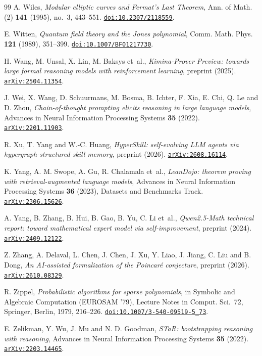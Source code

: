 \begin{thebibliography}{99}
A. Wiles,
\emph{Modular elliptic curves and Fermat's Last Theorem},
Ann. of Math. (2) \textbf{141} (1995), no.~3, 443--551.
\href{https://doi.org/10.2307/2118559}{\nolinkurl{doi:10.2307/2118559}}.

E. Witten,
\emph{Quantum field theory and the Jones polynomial},
Comm. Math. Phys. \textbf{121} (1989), 351--399.
\href{https://doi.org/10.1007/BF01217730}{\nolinkurl{doi:10.1007/BF01217730}}.

H. Wang, M. Unsal, X. Lin, M. Baksys et~al.,
\emph{Kimina-Prover Preview: towards large formal reasoning models with reinforcement learning},
preprint (2025).
\href{https://arxiv.org/abs/2504.11354}{\nolinkurl{arXiv:2504.11354}}.

J. Wei, X. Wang, D. Schuurmans, M. Bosma, B. Ichter, F. Xia, E. Chi, Q. Le and D. Zhou,
\emph{Chain-of-thought prompting elicits reasoning in large language models},
Advances in Neural Information Processing Systems \textbf{35} (2022).
\href{https://arxiv.org/abs/2201.11903}{\nolinkurl{arXiv:2201.11903}}.

R. Xu, T. Yang and W.-C. Huang,
\emph{HyperSkill: self-evolving LLM agents via hypergraph-structured skill memory},
preprint (2026).
\href{https://arxiv.org/abs/2608.16114}{\nolinkurl{arXiv:2608.16114}}.

K. Yang, A. M. Swope, A. Gu, R. Chalamala et~al.,
\emph{LeanDojo: theorem proving with retrieval-augmented language models},
Advances in Neural Information Processing Systems \textbf{36} (2023), Datasets and Benchmarks Track.
\href{https://arxiv.org/abs/2306.15626}{\nolinkurl{arXiv:2306.15626}}.

A. Yang, B. Zhang, B. Hui, B. Gao, B. Yu, C. Li et~al.,
\emph{Qwen2.5-Math technical report: toward mathematical expert model via self-improvement},
preprint (2024).
\href{https://arxiv.org/abs/2409.12122}{\nolinkurl{arXiv:2409.12122}}.

Z. Zhang, A. Delaval, L. Chen, J. Chen, J. Xu, Y. Liao, J. Jiang, C. Liu and B. Dong,
\emph{An AI-assisted formalization of the Poincar\'e conjecture},
preprint (2026).
\href{https://arxiv.org/abs/2610.08329}{\nolinkurl{arXiv:2610.08329}}.

R. Zippel,
\emph{Probabilistic algorithms for sparse polynomials},
in Symbolic and Algebraic Computation (EUROSAM '79), Lecture Notes in Comput. Sci.~72, Springer, Berlin, 1979, 216--226.
\href{https://doi.org/10.1007/3-540-09519-5_73}{\nolinkurl{doi:10.1007/3-540-09519-5_73}}.

E. Zelikman, Y. Wu, J. Mu and N. D. Goodman,
\emph{STaR: bootstrapping reasoning with reasoning},
Advances in Neural Information Processing Systems \textbf{35} (2022).
\href{https://arxiv.org/abs/2203.14465}{\nolinkurl{arXiv:2203.14465}}.

\end{thebibliography}
